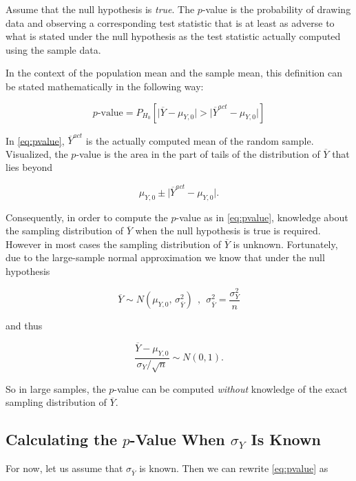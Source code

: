 \documentclass[]{book}
\theoremstyle{definition}
\theoremstyle{definition}
\theoremstyle{definition}
\theoremstyle{remark}
\begin{document}
Assume that the null hypothesis is \emph{true}. The \(p\)-value is the
probability of drawing data and observing a corresponding test statistic
that is at least as adverse to what is stated under the null hypothesis
as the test statistic actually computed using the sample data.

In the context of the population mean and the sample mean, this
definition can be stated mathematically in the following way:

\begin{equation}
p \text{-value} = P_{H_0}\left[ \lvert \overline{Y} - \mu_{Y,0} \rvert > \lvert \overline{Y}^{act} - \mu_{Y,0} \rvert \right] \label{eq:pvalue}
\end{equation}

In \eqref{eq:pvalue}, \(\overline{Y}^{act}\) is the actually computed mean
of the random sample. Visualized, the \(p\)-value is the area in the
part of tails of the distribution of \(\overline{Y}\) that lies beyond

\[ \mu_{Y,0} \pm \lvert \overline{Y}^{act} - \mu_{Y,0} \rvert. \]

Consequently, in order to compute the \(p\)-value as in \eqref{eq:pvalue},
knowledge about the sampling distribution of \(\overline{Y}\) when the
null hypothesis is true is required. However in most cases the sampling
distribution of \(\overline{Y}\) is unknown. Fortunately, due to the
large-sample normal approximation we know that under the null hypothesis

\[ \overline{Y} \sim N(\mu_{Y,0}, \, \sigma^2_{\overline{Y}}) \ \ , \ \ \sigma^2_{\overline{Y}} = \frac{\sigma_Y^2}{n} \]

and thus

\[ \frac{\overline{Y} - \mu_{Y,0}}{\sigma_Y/\sqrt{n}} \sim N(0,1). \]

So in large samples, the \(p\)-value can be computed \emph{without}
knowledge of the exact sampling distribution of \(\overline{Y}\).

\subsection*{\texorpdfstring{Calculating the \(p\)-Value When
\(\sigma_Y\) Is
Known}{Calculating the p-Value When \textbackslash{}sigma\_Y Is Known}}\label{calculating-the-p-value-when-sigma_y-is-known}

For now, let us assume that \(\sigma_{\overline{Y}}\) is known. Then we
can rewrite \eqref{eq:pvalue} as
\end{document}
